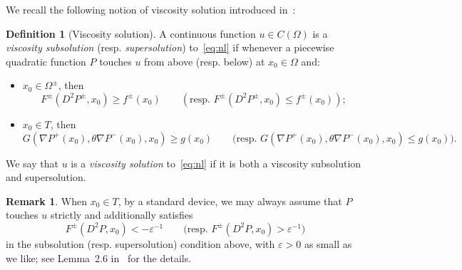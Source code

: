 \documentclass[letter,11pt]{amsart}
\newcommand{\vep}{\varepsilon}
\theoremstyle{definition}
\newtheorem{defn}[thm]{Definition}
\newtheorem{rem}[thm]{Remark}
\numberwithin{equation}{section}
\begin{document}
\medskip

We recall the following notion of viscosity solution introduced in~\cite{E}:
\begin{defn}[Viscosity solution]
\label{def:visc}
A continuous function $u \in C(\Omega)$ is a 
\emph{viscosity subsolution} (resp. \emph{supersolution}) to~\eqref{eq:nl} if whenever a piecewise quadratic function $P$ touches $u$ from above (resp. below) at $x_0 \in \Omega$ and:
\begin{itemize}
\item $x_0 \in \Omega^{\pm}$, then
\[
F^{\pm}(D^2 P^{\pm}, x_0) \geq f^{\pm}(x_0) \qquad (\text{resp. } F^{\pm}(D^2 P^{\pm}, x_0) \leq f^{\pm}(x_0));
\]
\item $x_0 \in T$, then
\[
G(\nabla P^{+}(x_0), \theta \nabla P^{-}(x_0), x_0) \geq g(x_0) 
\qquad 
\text{(resp. } 
G(\nabla P^{+}(x_0), \theta \nabla P^{-}(x_0), x_0) \leq g(x_0) ).
\]
\end{itemize}
We say that $u$ is a \emph{viscosity solution} to~\eqref{eq:nl} if it is both a viscosity subsolution and supersolution.
\end{defn}

\begin{rem}
\label{rem:trick}
When $x_0 \in T$, by a standard device, we may always assume that $P$ touches $u$ strictly and additionally satisfies
\[
F^{\pm}(D^2 P, x_0) < - \vep^{-1} 
\qquad 
\text{(resp. } 
F^{\pm}(D^2 P, x_0) > \vep^{-1}
\text{)}
\]
in the subsolution (resp. supersolution) condition above, with $\vep >0$ as small as we like; see Lemma~2.6 in~\cite{E} for the details.
\end{rem}

\medskip
\end{document}
